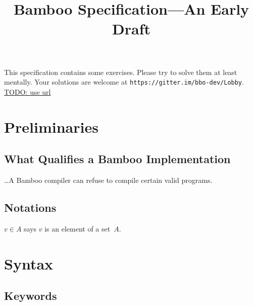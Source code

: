 \documentclass{book}
\title{Bamboo Specification---An Early Draft}
\newcommand{\todo}[1]{\underline{TODO: {#1}}}
\begin{document}
\maketitle

This specification contains some exercises.  Please try to solve them at least mentally.  Your solutions are welcome at \texttt{https://gitter.im/bbo-dev/Lobby}.  \todo{use url}

\chapter{Preliminaries}

\section{What Qualifies a Bamboo Implementation}

\ldots A Bamboo compiler can refuse to compile certain valid programs.

\section{Notations}

$v \in A$ says $v$ is an element of a set~$A$.

\chapter{Syntax}

\section{Keywords}

\newcommand{\abort}{\text{\texttt{abort;}}}
\newcommand{\true}{\text{\texttt{true}}}
\newcommand{\false}{\text{\texttt{false}}}
\newcommand{\msgsender}{\text{\texttt{msg.sender}}}
\newcommand{\msgvalue}{\text{\texttt{msg.value}}}
\newcommand{\this}{\text{\texttt{this}}}
\newcommand{\now}{\text{\texttt{now}}}
\newcommand{\paren}[1]{\mathtt{(}{#1}\mathtt{)}}
\newcommand{\logicalAnd}[2]{{#1}\mathbin{\text{\texttt{\&\&}}{#2}}}
\newcommand{\logicalNot}[1]{\mathop{\text{\texttt{not}}}{#1}}
\newcommand{\balance}[1]{\text{\texttt{balance}}\mathtt{(}{#1}\mathtt{)}}
\newcommand{\arrayAccess}[2]{{#1}[{#2}]}
\newcommand{\lt}[2]{{#1} \mathop{\text{\texttt{<}}} {#2}}
\newcommand{\gt}[2]{{#1} \mathop{\text{\texttt{>}}} {#2}}
\newcommand{\eq}[2]{{#1} \mathop{\text{\texttt{==}}} {#2}}
\newcommand{\notEq}[2]{{#1} \mathop{\text{\texttt{!=}}} {#2}}
\end{document}
